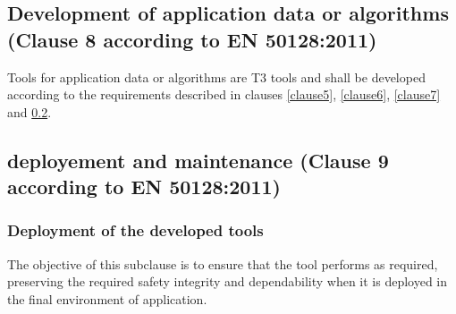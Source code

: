 \documentclass{template/openetcs_report}
\begin{document}
\subsection{Development of application data or algorithms (Clause 8 according to EN 50128:2011)}
Tools for application data or algorithms are T3 tools and shall be developed according to the requirements described in clauses \ref{clause5}, \ref{clause6}, \ref{clause7} and \ref{clause9}.
\linebreak
\linebreak


\subsection{deployement and maintenance (Clause 9 according to EN 50128:2011)}
\label{clause9}
\subsubsection{Deployment of the developed tools}
\begin{flushleft}
The objective of this subclause is to ensure that the tool performs as required, preserving the required safety integrity and dependability when it is deployed in the final environment of application.
\end{flushleft}
\end{document}
